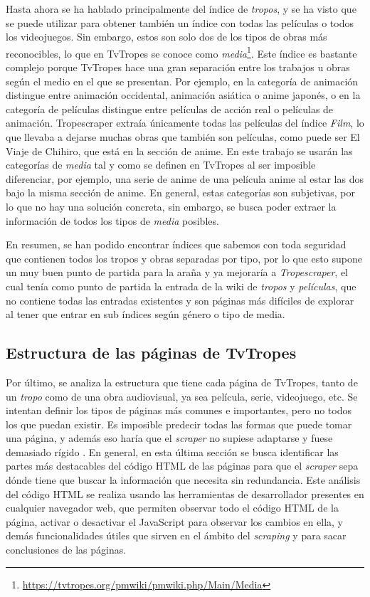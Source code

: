 Hasta ahora se ha hablado principalmente del índice de \textit{tropos}, y se ha
visto que se puede utilizar para obtener también un índice con todas las
películas o todos los videojuegos. Sin embargo, estos son solo dos de los tipos
de obras más reconocibles, lo que en TvTropes se conoce como
\textit{media}\footnote{\url{https://tvtropes.org/pmwiki/pmwiki.php/Main/Media}}.
Este índice es bastante complejo porque TvTropes hace una gran separación entre
los trabajos u obras según el medio en el que se presentan. Por ejemplo, en la
categoría de animación distingue entre animación occidental, animación asiática
o anime japonés, o en la categoría de películas distingue entre películas de
acción real o películas de animación. Tropescraper extraía únicamente todas las
películas del índice \textit{Film}, lo que llevaba a dejarse muchas obras que
también son películas, como puede ser El Viaje de Chihiro, que está en la
sección de anime. En este trabajo se usarán las categorías de \textit{media} tal
y como se definen en TvTropes al ser imposible diferenciar, por ejemplo, una
serie de anime de una película anime al estar las dos bajo la misma sección de
anime. En general, estas categorías son subjetivas, por lo que no hay una
solución concreta, sin embargo, se busca poder extraer la información de todos
los tipos de \textit{media} posibles.

En resumen, se han podido encontrar índices que sabemos con toda seguridad que
contienen todos los tropos y obras separadas por tipo, por lo que esto supone un
muy buen punto de partida para la araña y ya mejoraría a \textit{Tropescraper},
el cual tenía como punto de partida la entrada de la wiki de \textit{tropos} y
\textit{películas}, que no contiene todas las entradas existentes y son páginas
más difíciles de explorar al tener que entrar en sub índices según género o tipo
de media.

\subsection{Estructura de las páginas de TvTropes}
Por último, se analiza la estructura que tiene cada página de TvTropes, tanto de
un \textit{tropo} como de una obra audiovisual, ya sea película, serie,
videojuego, etc. Se intentan definir los tipos de páginas más comunes e
importantes, pero no todos los que puedan existir. Es imposible predecir todas
las formas que puede tomar una página, y además eso haría que el
\textit{scraper} no supiese adaptarse y fuese demasiado rígido
\cite{nishalscraping}. En general, en esta última sección se busca identificar
las partes más destacables del código HTML de las páginas para que el
\textit{scraper} sepa dónde tiene que buscar la información que necesita sin
redundancia. Este análisis del código HTML se realiza usando las herramientas de
desarrollador presentes en cualquier navegador web, que permiten observar todo
el código HTML de la página, activar o desactivar el JavaScript para observar
los cambios en ella, y demás funcionalidades útiles que sirven en el ámbito del
\textit{scraping} y para sacar conclusiones de las páginas.

